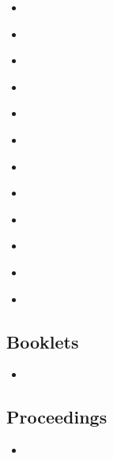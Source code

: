 \begin{itemize}
     \item \cite{mccolvin-nodate}
     \item \cite{nietzsche:ksa}
     \item \cite{nietzsche:ksa1}
     \item \cite{Oetiker2014}
     \item \cite{piccato}
     \item \cite{smart-76}
     \item \cite{vazques-de-parga}
     \item \cite{wilde}
     \item \cite{wood-61}
     \item \cite{worman}
     \item \cite{wright-78-book}
     \item \cite{whole-collection}
\end{itemize}



\subsection{Booklets}
\begin{itemize}
     \item \cite{booklet-full}
  \end{itemize}


\subsection{Proceedings}
\begin{itemize}
     \item \cite{proceedings-full}
\end{itemize}


